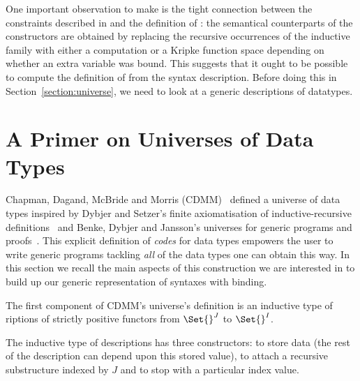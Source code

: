 One important observation to make is the tight connection between the constraints
described in \semrec{} and the definition of : the semantical counterparts
of the  constructors are obtained by replacing the recursive occurrences of
the inductive family with either a computation or a Kripke function space depending
on whether an extra variable was bound. This suggests that it ought to be possible
to compute the definition of \semrec{} from the syntax description. Before doing this
in Section~\ref{section:universe}, we need to look at a generic descriptions of
datatypes.




\section{A Primer on Universes of Data Types}\label{section:data}

Chapman, Dagand, McBride and Morris (CDMM)~\citeyear{Chapman:2010:GAL:1863543.1863547}
defined a universe of data types inspired by Dybjer and Setzer's
finite axiomatisation of inductive-recursive definitions~\citeyear{Dybjer1999}
and Benke, Dybjer and Jansson's universes for generic programs and proofs~\citeyear{benke-ugpp}.
This explicit definition of \emph{codes} for data types empowers the
user to write generic programs tackling \emph{all} of the data types
one can obtain this way. In this section we recall the main aspects
of this construction we are interested in to build up our generic
representation of syntaxes with binding.

The first component of CDMM's universe's definition is an inductive type of
riptions of strictly positive functors from $\Set{}^J$ to $\Set{}^I$.

The inductive type of descriptions has three constructors:
 to store data (the rest of
the description can depend upon this stored value),  to attach a
recursive substructure indexed by $J$ and  to stop
with a particular index value.

